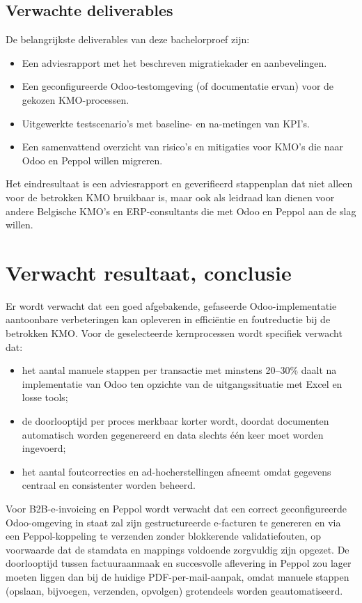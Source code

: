 \subsection*{Verwachte deliverables}

De belangrijkste deliverables van deze bachelorproef zijn:
\begin{itemize}
  \item Een adviesrapport met het beschreven migratiekader en aanbevelingen.
  \item Een geconfigureerde Odoo-testomgeving (of documentatie ervan) voor de gekozen KMO-processen.
  \item Uitgewerkte testscenario’s met baseline- en na-metingen van KPI’s.
  \item Een samenvattend overzicht van risico’s en mitigaties voor KMO’s die naar Odoo en Peppol willen migreren.
\end{itemize}

Het eindresultaat is een adviesrapport en geverifieerd stappenplan dat niet alleen voor de betrokken KMO bruikbaar is, maar ook als leidraad kan dienen voor andere Belgische KMO’s en ERP-consultants die met Odoo en Peppol aan de slag willen.


\section{Verwacht resultaat, conclusie}%
\label{sec:verwachte_resultaten}

Er wordt verwacht dat een goed afgebakende, gefaseerde Odoo-implementatie aantoonbare verbeteringen kan opleveren in efficiëntie en foutreductie bij de betrokken KMO. Voor de geselecteerde kernprocessen wordt specifiek verwacht dat:
\begin{itemize}
  \item het aantal manuele stappen per transactie met minstens 20–30\% daalt na implementatie van Odoo ten opzichte van de uitgangssituatie met Excel en losse tools;
  \item de doorlooptijd per proces merkbaar korter wordt, doordat documenten automatisch worden gegenereerd en data slechts één keer moet worden ingevoerd;
  \item het aantal foutcorrecties en ad-hocherstellingen afneemt omdat gegevens centraal en consistenter worden beheerd.
\end{itemize}

Voor B2B-e-invoicing en Peppol wordt verwacht dat een correct geconfigureerde Odoo-omgeving in staat zal zijn gestructureerde e-facturen te genereren en via een Peppol-koppeling te verzenden zonder blokkerende validatiefouten, op voorwaarde dat de stamdata en mappings voldoende zorgvuldig zijn opgezet. De doorlooptijd tussen factuuraanmaak en succesvolle aflevering in Peppol zou lager moeten liggen dan bij de huidige PDF-per-mail-aanpak, omdat manuele stappen (opslaan, bijvoegen, verzenden, opvolgen) grotendeels worden geautomatiseerd.

